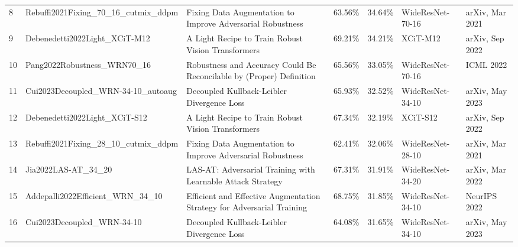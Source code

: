 \begin{table}[]
\begin{tabular}{lllllll}
  8  & Rebuffi2021Fixing\_70\_16\_cutmix\_ddpm       & Fixing Data Augmentation to Improve Adversarial Robustness                                                         & 63.56\%        & 34.64\%         & WideResNet-70-16                               & arXiv, Mar 2021      \\
  9  & Debenedetti2022Light\_XCiT-M12                & A Light Recipe to Train Robust Vision Transformers                                                                 & 69.21\%        & 34.21\%         & XCiT-M12                                       & arXiv, Sep 2022      \\
  10 & Pang2022Robustness\_WRN70\_16                 & Robustness and Accuracy Could Be Reconcilable by (Proper) Definition                                               & 65.56\%        & 33.05\%         & WideResNet-70-16                               & ICML 2022            \\
  11 & Cui2023Decoupled\_WRN-34-10\_autoaug          & Decoupled Kullback-Leibler Divergence Loss                                                                         & 65.93\%        & 32.52\%         & WideResNet-34-10                               & arXiv, May 2023      \\
  12 & Debenedetti2022Light\_XCiT-S12                & A Light Recipe to Train Robust Vision Transformers                                                                 & 67.34\%        & 32.19\%         & XCiT-S12                                       & arXiv, Sep 2022      \\
  13 & Rebuffi2021Fixing\_28\_10\_cutmix\_ddpm       & Fixing Data Augmentation to Improve Adversarial Robustness                                                         & 62.41\%        & 32.06\%         & WideResNet-28-10                               & arXiv, Mar 2021      \\
  14 & Jia2022LAS-AT\_34\_20                         & LAS-AT: Adversarial Training with Learnable Attack Strategy                                                        & 67.31\%        & 31.91\%         & WideResNet-34-20                               & arXiv, Mar 2022      \\
  15 & Addepalli2022Efficient\_WRN\_34\_10           & Efficient and Effective Augmentation Strategy for Adversarial Training                                             & 68.75\%        & 31.85\%         & WideResNet-34-10                               & NeurIPS 2022         \\
  16 & Cui2023Decoupled\_WRN-34-10                   & Decoupled Kullback-Leibler Divergence Loss                                                                         & 64.08\%        & 31.65\%         & WideResNet-34-10                               & arXiv, May 2023      \\

\end{tabular}
\end{table}
